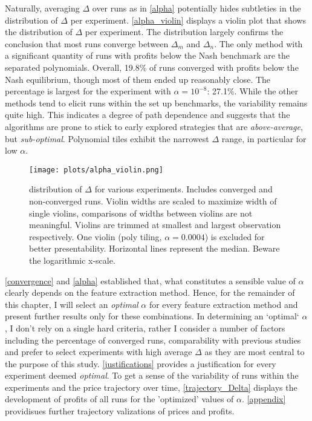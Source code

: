 Naturally, averaging $\Delta$ over runs as in \autoref{alpha} potentially hides subtleties in the distribution of $\Delta$ per experiment. \autoref{alpha_violin} displays a violin plot that shows the distribution of $\Delta$ per experiment. The distribution largely confirms the conclusion that most runs converge between $\Delta_m$ and $\Delta_n$. The only method with a significant quantity of runs with profits below the Nash benchmark are the separated polynomials. Overall, 19.8\% of runs converged with profits below the Nash equilibrium, though most of them ended up reasonably close. The percentage is largest for the experiment with $\alpha = 10^{-8}$: 27.1\%. While the other methods tend to elicit runs within the set up benchmarks, the variability remains quite high. This indicates a degree of path dependence and suggests that the algorithms are prone to stick to early explored strategies that are \emph{above-average}, but \emph{sub-optimal}. Polynomial tiles exhibit the narrowest $\Delta$ range, in particular for low $\alpha$.

\begin{figure}
	\texttt{[image: plots/alpha\_violin.png]}
	\caption{distribution of $\Delta$ for various experiments. Includes converged and non-converged runs. Violin widths are scaled to maximize width of single violins, comparisons of widths between violins are not meaningful. Violins are trimmed at smallest and largest observation respectively. One violin (poly tiling, $\alpha = 0.0004$) is excluded for better presentability. Horizontal lines represent the median. Beware the logarithmic x-scale.}
	\label{alpha_violin}
\end{figure}


\autoref{convergence} and \autoref{alpha} established that, what constitutes a sensible value of $\alpha$ clearly depends on the feature extraction method. Hence, for the remainder of this chapter, I will select an \emph{optimal} $\alpha$ for every feature extraction method and present further results only for these combinations. In determining an `optimal` $\alpha$, I don't rely on a single hard criteria, rather I consider a number of factors including the percentage of converged runs, comparability with previous studies and prefer to select experiments with high average $\Delta$ as they are most central to the purpose of this study. \autoref{justifications} provides a justification for every experiment deemed \emph{optimal}. To get a sense of the variability of runs within the experiments and the price trajectory over time, \autoref{trajectory_Delta} displays the development of profits of all runs for the 'optimized' values of $\alpha$. \autoref{appendix} providisues further trajectory valizations of prices and profits.

